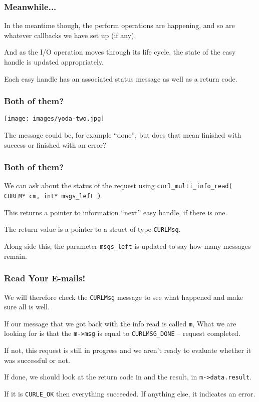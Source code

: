 \begin{frame}
	\frametitle{Meanwhile...}

	In the meantime though, the perform operations are happening, and so are whatever callbacks we have set up (if any).

	And as the I/O operation moves through its life cycle, the state of the easy handle is updated appropriately.

	Each easy handle has an associated status message as well as a return code.


\end{frame}


\begin{frame}
	\frametitle{Both of them?}
	\begin{center}
		\texttt{[image: images/yoda-two.jpg]}
	\end{center}

	The message could be, for example ``done'', but does that mean finished with success or finished with an error?
\end{frame}

\begin{frame}
	\frametitle{Both of them?}
	We can ask about the status of the request using \texttt{curl\_multi\_info\_read( CURLM* cm, int* msgs\_left )}.

	This returns a pointer to information ``next'' easy handle, if there is one.

	The return value is a pointer to a struct of type \texttt{CURLMsg}.

	Along side this, the parameter \texttt{msgs\_left} is updated to say how many messages remain.

\end{frame}

\begin{frame}
	\frametitle{Read Your E-mails!}

	We will therefore check the \texttt{CURLMsg} message to see what happened and make sure all is well.

	If our message that we got back with the info read is called \texttt{m}, What we are looking for is that the \texttt{m->msg} is equal to \texttt{CURLMSG\_DONE} -- request completed.

	If not, this request is still in progress and we aren't ready to evaluate whether it was successful or not.

	If done, we should look at the return code in and the result, in \texttt{m->data.result}.

	If it is \texttt{CURLE\_OK} then everything succeeded. If anything else, it indicates an error.


\end{frame}

